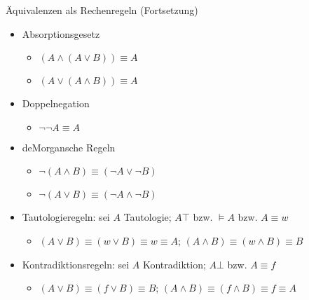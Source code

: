 \begin{frame}{Äquivalenzen als Rechenregeln (Fortsetzung)}
	\begin{itemize}
		\item Absorptionsgesetz
		\begin{itemize}
			\item $(A \land (A \lor B)) \equiv A$
			\item $(A \lor (A \land B)) \equiv A$
		\end{itemize}
		\item Doppelnegation
		\begin{itemize}
			\item $\neg \neg A \equiv A$
		\end{itemize}
		\item deMorgansche Regeln
		\begin{itemize}
			\item $\neg (A \land B) \equiv (\neg A \lor \neg B)$
			\item $\neg (A \lor B) \equiv (\neg A \land \neg B)$
		\end{itemize}
		\item Tautologieregeln: sei $A$ Tautologie; $A\top$ bzw. $\models A$ bzw. $A \equiv w$
		\begin{itemize}
			\item $(A \lor B) \equiv (w \lor B) \equiv w \equiv A$; $(A \land B) \equiv (w \land B) \equiv B$
		\end{itemize}
		\item Kontradiktionsregeln: sei $A$ Kontradiktion; $A\bot$ bzw. $A \equiv f$
		\begin{itemize}
			\item $(A \lor B) \equiv (f \lor B) \equiv B$; $(A \land B) \equiv (f \land B) \equiv f \equiv A$
		\end{itemize}
	\end{itemize}
\end{frame}

